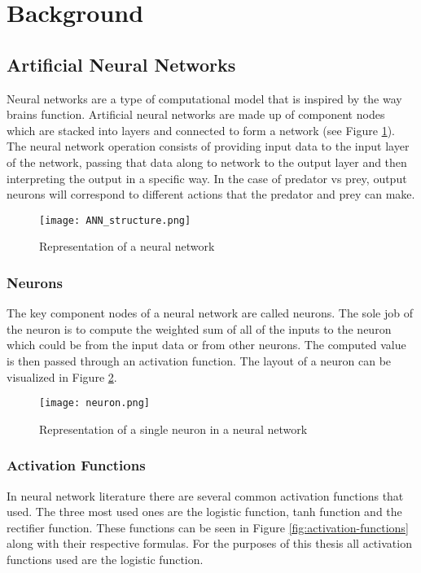 
\section{Background}

\subsection{Artificial Neural Networks}
Neural networks are a type of computational model that is inspired by the way brains function. Artificial neural networks are made up of component nodes which are stacked into layers and connected to form a network (see Figure \ref{fig:neural-network}). The neural network operation consists of providing input data to the input layer of the network, passing that data along to network to the output layer and then interpreting the output in a specific way. In the case of predator vs prey, output neurons will correspond to different actions that the predator and prey can make.

\begin{figure}
  \centering
  \texttt{[image: ANN\_structure.png]}
  \caption{Representation of a neural network}
  \label{fig:neural-network}
\end{figure}

\subsubsection{Neurons}
The key component nodes of a neural network are called neurons. The sole job of the neuron is to compute the weighted sum of all of the inputs to the neuron which could be from the input data or from other neurons. The computed value is then passed through an activation function. The layout of a neuron can be visualized in Figure \ref{fig:neuron}.


\begin{figure}
  \centering
  \texttt{[image: neuron.png]}
  \caption{Representation of a single neuron in a neural network}
  \label{fig:neuron}
\end{figure}

\subsubsection{Activation Functions}
In neural network literature there are several common activation functions that used. The three most used ones are the logistic function, tanh function and the rectifier function. These functions can be seen in Figure \ref{fig:activation-functions} along with their respective formulas. For the purposes of this thesis all activation functions used are the logistic function.



